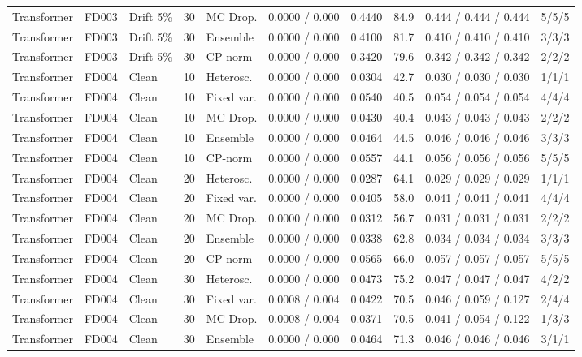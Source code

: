 \documentclass[10pt,a4paper]{article}
\begin{document}
\begin{landscape}
\begin{center}
\begin{longtable}{lllllcclll}
Transformer & FD003 & Drift 5\% & 30 & MC Drop. & 0.0000 / 0.000 & 0.4440 & 84.9 & 0.444 / 0.444 / 0.444 & 5/5/5 \\
Transformer & FD003 & Drift 5\% & 30 & Ensemble & 0.0000 / 0.000 & 0.4100 & 81.7 & 0.410 / 0.410 / 0.410 & 3/3/3 \\
Transformer & FD003 & Drift 5\% & 30 & CP-norm & 0.0000 / 0.000 & 0.3420 & 79.6 & 0.342 / 0.342 / 0.342 & 2/2/2 \\
Transformer & FD004 & Clean & 10 & Heterosc. & 0.0000 / 0.000 & 0.0304 & 42.7 & 0.030 / 0.030 / 0.030 & 1/1/1 \\
Transformer & FD004 & Clean & 10 & Fixed var. & 0.0000 / 0.000 & 0.0540 & 40.5 & 0.054 / 0.054 / 0.054 & 4/4/4 \\
Transformer & FD004 & Clean & 10 & MC Drop. & 0.0000 / 0.000 & 0.0430 & 40.4 & 0.043 / 0.043 / 0.043 & 2/2/2 \\
Transformer & FD004 & Clean & 10 & Ensemble & 0.0000 / 0.000 & 0.0464 & 44.5 & 0.046 / 0.046 / 0.046 & 3/3/3 \\
Transformer & FD004 & Clean & 10 & CP-norm & 0.0000 / 0.000 & 0.0557 & 44.1 & 0.056 / 0.056 / 0.056 & 5/5/5 \\
Transformer & FD004 & Clean & 20 & Heterosc. & 0.0000 / 0.000 & 0.0287 & 64.1 & 0.029 / 0.029 / 0.029 & 1/1/1 \\
Transformer & FD004 & Clean & 20 & Fixed var. & 0.0000 / 0.000 & 0.0405 & 58.0 & 0.041 / 0.041 / 0.041 & 4/4/4 \\
Transformer & FD004 & Clean & 20 & MC Drop. & 0.0000 / 0.000 & 0.0312 & 56.7 & 0.031 / 0.031 / 0.031 & 2/2/2 \\
Transformer & FD004 & Clean & 20 & Ensemble & 0.0000 / 0.000 & 0.0338 & 62.8 & 0.034 / 0.034 / 0.034 & 3/3/3 \\
Transformer & FD004 & Clean & 20 & CP-norm & 0.0000 / 0.000 & 0.0565 & 66.0 & 0.057 / 0.057 / 0.057 & 5/5/5 \\
Transformer & FD004 & Clean & 30 & Heterosc. & 0.0000 / 0.000 & 0.0473 & 75.2 & 0.047 / 0.047 / 0.047 & 4/2/2 \\
Transformer & FD004 & Clean & 30 & Fixed var. & 0.0008 / 0.004 & 0.0422 & 70.5 & 0.046 / 0.059 / 0.127 & 2/4/4 \\
Transformer & FD004 & Clean & 30 & MC Drop. & 0.0008 / 0.004 & 0.0371 & 70.5 & 0.041 / 0.054 / 0.122 & 1/3/3 \\
Transformer & FD004 & Clean & 30 & Ensemble & 0.0000 / 0.000 & 0.0464 & 71.3 & 0.046 / 0.046 / 0.046 & 3/1/1 \\

\end{longtable}
\end{center}
\end{landscape}
\end{document}
